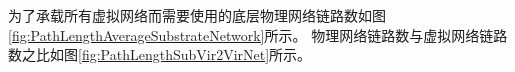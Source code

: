 为了承载所有虚拟网络而需要使用的底层物理网络链路数如图\ref{fig:PathLengthAverageSubstrateNetwork}所示。
物理网络链路数与虚拟网络链路数之比如图\ref{fig:PathLengthSubVir2VirNet}所示。
